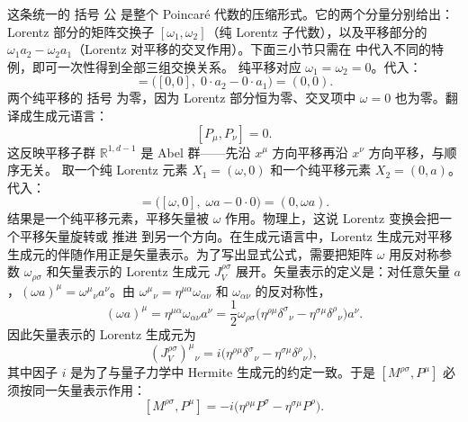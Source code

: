 这条统一的 括号 公 是整个 Poincaré 代数的压缩形式。它的两个分量分别给出：Lorentz 部分的矩阵交换子 $[\omega_1,\omega_2]$（纯 Lorentz 子代数），以及平移部分的 $\omega_1 a_2-\omega_2 a_1$（Lorentz 对平移的交叉作用）。下面三小节只需在 中代入不同的特例，即可一次性得到全部三组交换关系。
纯平移对应 $\omega_1=\omega_2=0$。代入：
\begin{equation*}
[(0,a_1),(0,a_2)]=\big([0,0],\;0\cdot a_2-0\cdot a_1\big)=(0,0).
\end{equation*}
两个纯平移的 括号 为零，因为 Lorentz 部分恒为零、交叉项中 $\omega=0$ 也为零。翻译成生成元语言：
\begin{equation}\label{eq:ms-poincare-PP}
\boxed{[P_\mu,P_\nu]=0.}
\end{equation}
这反映平移子群 $\mathbb{R}^{1,d-1}$ 是 Abel 群——先沿 $x^\mu$ 方向平移再沿 $x^\nu$ 方向平移，与顺序无关。
取一个纯 Lorentz 元素 $X_1=(\omega,0)$ 和一个纯平移元素 $X_2=(0,a)$。代入：
\begin{equation*}
[(\omega,0),(0,a)]=\big([\omega,0],\;\omega a-0\cdot 0\big)=(0,\omega a).
\end{equation*}
结果是一个纯平移元素，平移矢量被 $\omega$ 作用。物理上，这说 Lorentz 变换会把一个平移矢量旋转或 推进 到另一个方向。在生成元语言中，Lorentz 生成元对平移生成元的伴随作用正是矢量表示。为了写出显式公式，需要把矩阵 $\omega$ 用反对称参数 $\omega_{\rho\sigma}$ 和矢量表示的 Lorentz 生成元 $J_V^{\rho\sigma}$ 展开。矢量表示的定义是：对任意矢量 $a$，$(\omega a)^\mu=\omega^\mu{}_\nu a^\nu$。由 $\omega^\mu{}_\nu=\eta^{\mu\alpha}\omega_{\alpha\nu}$ 和 $\omega_{\alpha\nu}$ 的反对称性，
\begin{equation*}
(\omega a)^\mu=\eta^{\mu\alpha}\omega_{\alpha\nu}a^\nu=\frac{1}{2}\omega_{\rho\sigma}\big(\eta^{\rho\mu}\delta^\sigma{}_\nu-\eta^{\sigma\mu}\delta^\rho{}_\nu\big)a^\nu.
\end{equation*}
因此矢量表示的 Lorentz 生成元为
\begin{equation}\label{eq:ms-poincare-JV}
\boxed{
(J_V^{\rho\sigma})^\mu{}_\nu=i\big(\eta^{\rho\mu}\delta^\sigma{}_\nu-\eta^{\sigma\mu}\delta^\rho{}_\nu\big),
}
\end{equation}
其中因子 $i$ 是为了与量子力学中 Hermite 生成元的约定一致。于是 $[M^{\rho\sigma},P^\mu]$ 必须按同一矢量表示作用：
\begin{equation}\label{eq:ms-poincare-MP}
\boxed{
[M^{\rho\sigma},P^\mu]=-i\big(\eta^{\rho\mu}P^\sigma-\eta^{\sigma\mu}P^\rho\big).
}
\end{equation}
